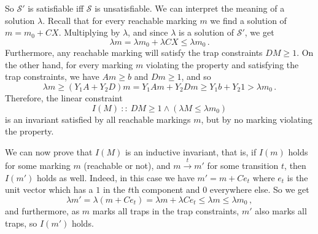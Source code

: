 So $\mathcal{S}'$ is satisfiable if{}f $\mathcal{S}$ is unsatisfiable. We can
interpret the meaning of a solution $\lambda$. Recall that
for every reachable marking $m$ we find a solution of 
$m = m_0 + CX$. Multiplying by $\lambda$, and since $\lambda$ is a solution
of $\mathcal{S}'$, we get 
$$\lambda m = \lambda m_0 + \lambda CX \leq \lambda m_0\,.$$
Furthermore, any reachable marking will satisfy the trap constraints $DM\geq 1$.
On the other hand, for every marking $m$ violating the property
and satisfying the trap constraints, 
we have $ Am \geq b$ and $ Dm \geq 1$, and so
$$\lambda m \geq (Y_1 A + Y_2 D)m = Y_1 A m + Y_2 D m \geq
Y_1 b + Y_2 1 > \lambda m_0\,.$$
%
Therefore, the linear constraint
$$I(M)\  :: \  DM\geq 1 \land (\lambda M \leq \lambda m_0)$$
is an invariant satisfied by all reachable markings $m$, 
but by no marking violating the property.

We can now prove that $I(M)$ is an inductive invariant, that is, if
$I(m)$ holds for some marking $m$ (reachable or not), and $m \xrightarrow{t} m'$
for some transition $t$, then $I(m')$ holds as well.
Indeed, in this case we have $m' = m + C e_t$ where
$e_t$ is the unit vector which has a $1$ in the $t$th component and $0$ everywhere else.
So we get $$\lambda m' = \lambda(m + Ce_t) = \lambda m + \lambda Ce_t
\le \lambda m \le \lambda m_0\,,$$
and furthermore, as $m$ marks all traps in the trap constraints, 
$m'$ also marks all traps, so $I(m')$ holds.




